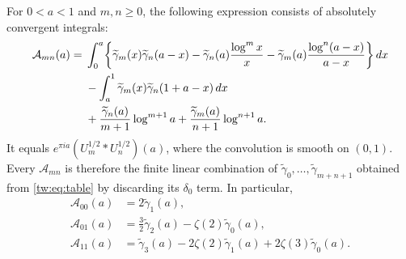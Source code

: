 \begin{theorem}
\label{tw:thm:alternating}
For $0<a<1$ and $m,n\ge0$, the following expression consists of
absolutely convergent integrals:
\begin{align}
 \mathcal A_{mn}(a)={}&
 \int_0^a\biggl\{
      \widetilde\gamma_m(x)\widetilde\gamma_n(a-x)
       -\widetilde\gamma_n(a)\frac{\log^m x}{x}
       -\widetilde\gamma_m(a)\frac{\log^n(a-x)}{a-x}
                 \biggr\}\,dx\notag\\
 &-\int_a^1\widetilde\gamma_m(x)
                        \widetilde\gamma_n(1+a-x)\,dx\notag\\
 &+\frac{\widetilde\gamma_n(a)}{m+1}\log^{m+1}a
       +\frac{\widetilde\gamma_m(a)}{n+1}\log^{n+1}a.
 \label{tw:eq:Amn}
\end{align}
It equals $e^{\pi ia}(U_m^{1/2}*U_n^{1/2})(a)$, where the
convolution is smooth on $(0,1)$. Every $\mathcal A_{mn}$ is
therefore the finite linear combination of
$\widetilde\gamma_0,\ldots,\widetilde\gamma_{m+n+1}$ obtained
from \eqref{tw:eq:table} by discarding its $\delta_0$ term.
In particular,
\begin{align}
 \mathcal A_{00}(a)&=2\widetilde\gamma_1(a),
       \label{tw:eq:A00}\\
 \mathcal A_{01}(a)&=\tfrac32\widetilde\gamma_2(a)
                          -\zeta(2)\widetilde\gamma_0(a),
       \label{tw:eq:A01}\\
 \mathcal A_{11}(a)&=\widetilde\gamma_3(a)
             -2\zeta(2)\widetilde\gamma_1(a)
             +2\zeta(3)\widetilde\gamma_0(a).
       \label{tw:eq:A11}
\end{align}
\end{theorem}

